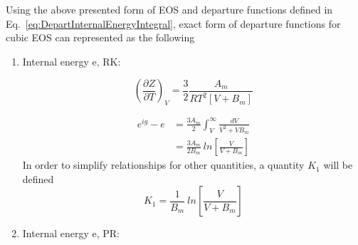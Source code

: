 \documentclass[11pt]{article}
\begin{document}
Using the above presented form of EOS and departure functions defined in Eq.~\ref{eq:DepartInternalEnergyIntegral}, exact form of departure functions for cubic EOS can represented as the following 
\begin{enumerate}
\item Internal energy e, RK: 

\begin{equation}
\left(\frac{\partial Z}{\partial T}\right)_{V} = \frac{3}{2} \frac{A_{m}}{R T^{2} \left[V+B_{m} \right]}
\end{equation}

\begin{align}
e^{ig} - e &= \frac{3 A_{m}}{2} \int_{V}^{\infty} \frac{dV}{V^{2}+V B_{m}} \\
               & = \frac{3 A_{m}}{2 B_{m}} ~ln \left[\frac{V}{V+B_{m}}\right]
\end{align}
In order to simplify relationships for other quantities, a quantity $K_{1}$ will be defined
\begin{equation}
K_{1} = \frac{1}{B_{m}} ~ln \left[\frac{V}{V+B_{m}}\right]
\end{equation}
\item Internal energy e, PR:


\end{enumerate}
\end{document}

